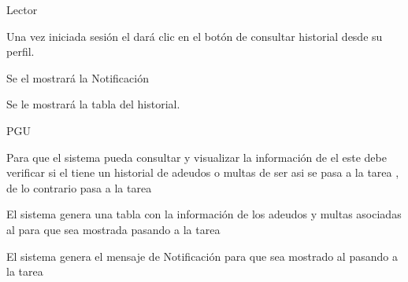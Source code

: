 \begin{PDescripcion}

  \Ppaso Lector 

    \begin{enumerate}

      \Ppaso[\itarea]  Una vez iniciada sesión el  dará clic en el botón de consultar historial desde su perfil.
      
            \Ppaso[\itarea]  Se el mostrará la Notificación  
            
            \Ppaso[\itarea]  Se le mostrará la tabla del historial.              
            
    \end{enumerate}

  \Ppaso PGU
    \begin{enumerate}

      \Ppaso[\itarea]  Para que el sistema pueda consultar y visualizar la información de el  este debe verificar si el      tiene un historial de adeudos o multas de ser asi se pasa a la tarea , de lo contrario pasa a la tarea 

      \Ppaso[\itarea]  El sistema genera una tabla con la información de los adeudos y multas asociadas al  para que sea mostrada pasando a la tarea 

      \Ppaso[\itarea]  El sistema genera el mensaje de Notificación  para que sea mostrado al  pasando a la tarea 

      
    \end{enumerate}

\end{PDescripcion}
